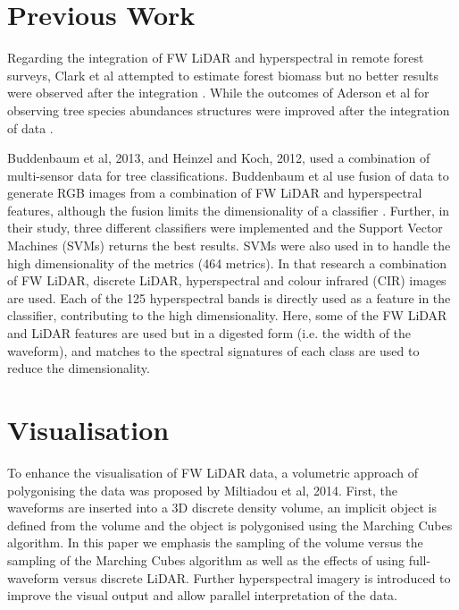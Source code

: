 \documentclass{subfiles}
\begin{document}
	\section{Previous Work}
	
	\par Regarding the integration of FW LiDAR and hyperspectral in remote forest surveys, Clark et al attempted to estimate forest biomass but no better results were observed after the integration \cite{Clark2011}. While the outcomes of Aderson et al for observing tree species abundances structures were improved after the integration of data \cite{Anderson2008}.
	
	\par \cite{Buddenbaum2013} Buddenbaum et al, 2013, and \cite{Heinzel2012} Heinzel and Koch, 2012, used a combination of multi-sensor data for tree classifications. Buddenbaum et al use fusion of data to generate RGB images from a combination of FW LiDAR and hyperspectral features, although the fusion limits the dimensionality of a classifier \cite{Buddenbaum2013}. Further, in their study, three different classifiers were implemented and the Support Vector Machines (SVMs) returns the best results. SVMs were also used in \cite{Heinzel2012} to handle the high dimensionality of the metrics (464 metrics). In that research a combination of FW LiDAR, discrete LiDAR, hyperspectral and colour infrared (CIR) images are used. Each of the 125 hyperspectral bands is directly used as a feature in the classifier, contributing to the high dimensionality. Here, some of the FW 	LiDAR and LiDAR features are used but in a digested form (i.e. the width of the waveform), and matches to the spectral signatures of each class are used to reduce the dimensionality.
	
	\section{Visualisation}
	\par To enhance the visualisation of FW LiDAR data, a volumetric approach of polygonising the data was proposed by Miltiadou et al, 2014. First, the waveforms are inserted into a 3D discrete density volume, an implicit object is defined from the volume and the object is polygonised using the Marching Cubes algorithm. In this paper we emphasis the sampling of the volume versus the sampling of the Marching Cubes algorithm as well as the effects of using full-waveform versus discrete LiDAR. Further hyperspectral imagery is introduced to improve the visual output and allow parallel interpretation of the data.
	
\end{document}
